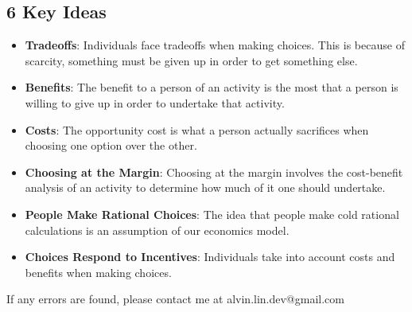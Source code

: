 \documentclass[letterpaper, 12pt]{article}
\begin{document}
\subsection*{6 Key Ideas}
\begin{itemize}
  \item \textbf{Tradeoffs}: Individuals face tradeoffs when making choices.
  This is because of scarcity, something must be given up in order to get
  something else.
  \item \textbf{Benefits}: The benefit to a person of an activity is the most
  that a person is willing to give up in order to undertake that activity.
  \item \textbf{Costs}: The opportunity cost is what a person actually
  sacrifices when choosing one option over the other.
  \item \textbf{Choosing at the Margin}: Choosing at the margin involves
  the cost-benefit analysis of an activity to determine how much of it one
  should undertake.
  \item \textbf{People Make Rational Choices}: The idea that people make cold
  rational calculations is an assumption of our economics model.
  \item \textbf{Choices Respond to Incentives}: Individuals take into account
  costs and benefits when making choices.
\end{itemize}

\begin{center}
  If any errors are found, please contact me at alvin.lin.dev@gmail.com
\end{center}
\end{document}
